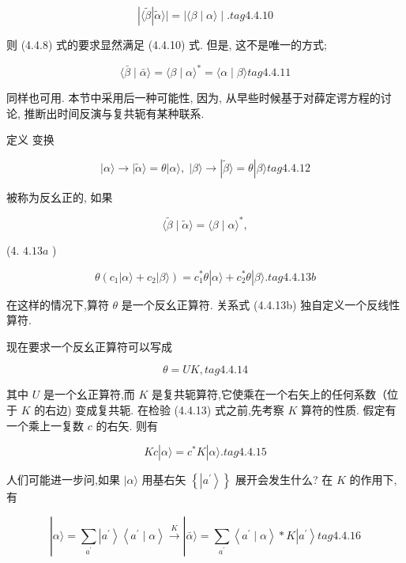 $$
\left| {\langle \widetilde{\beta }}\right| \widetilde{\alpha }\rangle \left| = \right| \langle \beta \mid \alpha \rangle \mid . tag{4. 4.10}
$$

则 (4.4.8) 式的要求显然满足 (4.4.10) 式. 但是, 这不是唯一的方式;

$$
\langle \bar{\beta } \mid \bar{\alpha }\rangle = \langle \beta \mid \alpha {\rangle }^{ * } = \langle \alpha \mid \beta \rangle tag{4. 4.11}
$$

同样也可用. 本节中采用后一种可能性, 因为, 从早些时候基于对薛定谔方程的讨论, 推断出时间反演与复共轭有某种联系.

定义 变换

$$
\left| {\alpha \rangle \rightarrow }\right| \widetilde{\alpha }\rangle = \theta \left| {\alpha \rangle ,\;}\right| \beta \rangle \rightarrow \left| {\widetilde{\beta }\rangle = \theta }\right| \beta \rangle tag{4. 4.12}
$$

被称为反幺正的, 如果

$$
\langle \widetilde{\beta } \mid \widetilde{\alpha }\rangle = \langle \beta \mid \alpha {\rangle }^{ * },
$$

(4. ${4.13a}$ )

$$
\theta \left( {{c}_{1}\left| {\alpha \rangle + {c}_{2}}\right| \beta \rangle }\right) = {c}_{1}^{ * }\theta \left| {\alpha \rangle + {c}_{2}^{ * }\theta }\right| \beta \rangle . tag{4. 4.13b}
$$

在这样的情况下,算符 $\theta$ 是一个反幺正算符. 关系式 (4.4.13b) 独自定义一个反线性算符.

现在要求一个反幺正算符可以写成

$$
\theta = {UK}, tag{4. 4.14}
$$

其中 $U$ 是一个幺正算符,而 $K$ 是复共轭算符,它使乘在一个右矢上的任何系数（位于 $K$ 的右边) 变成复共轭. 在检验 (4.4.13) 式之前,先考察 $K$ 算符的性质. 假定有一个乘上一复数 $c$ 的右矢. 则有

$$
{Kc}\left| {\alpha \rangle = {c}^{ * }K}\right| \alpha \rangle . tag{4. 4.15}
$$

人们可能进一步问,如果 $|\alpha \rangle$ 用基右矢 $\left\{ \left| {a}^{\prime }\right\rangle \right\}$ 展开会发生什么? 在 $K$ 的作用下,有

$$
\left| {\alpha \rangle = \mathop{\sum }\limits_{{a}^{\prime }}\left| {a}^{\prime }\right\rangle \left\langle {{a}^{\prime } \mid \alpha }\right\rangle \overset{K}{ \rightarrow }}\right| \bar{\alpha }\rangle = \mathop{\sum }\limits_{{a}^{\prime }}\left\langle {{a}^{\prime } \mid \alpha }\right\rangle * K\left| {a}^{\prime }\right\rangle tag{4. 4.16}
$$

